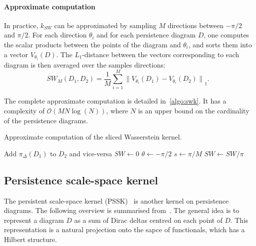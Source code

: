 \documentclass[a4paper,11pt,openany,extrafontsizes]{memoir}
\begin{document}
\paragraph{Approximate computation}

In practice, $k_{SW}$ can be approximated by sampling $M$ directions
between $-\pi/2$ and $\pi/2$. For each direction $\theta_i$ and for
each persistence diagram $D$, one computes the scalar products between
the points of the diagram and $\theta_i$, and sorts them into a vector
$V_{\theta_i}(D)$. The $L_1$-distance between the vectors
corresponding to each diagram is then averaged over the samples
directions:
\[ SW_M(D_1, D_2) = \frac{1}{M} \sum_{i=1}^M {\lVert V_{\theta_i}(D_1)
    - V_{\theta_i}(D_2) \rVert}_1. \]

The complete approximate computation is detailed
in~\autoref{algo:swk}. It has a complexity of
$\mathcal{O}(MN\log(N))$, where $N$ is an upper bound on the
cardinality of the persistence diagrams.

\begin{algorithm}[ht]
  \caption{Approximate computation of the sliced Wasserstein kernel.}\label{algo:swk}
  \DontPrintSemicolon%
  Add $\pi_\Delta(D_1)$ to $D_2$ and vice-versa\;
  $SW \leftarrow 0$\;
  $\theta \leftarrow -\pi/2$\;
  $s \leftarrow \pi/M$\;
  $SW \leftarrow SW/\pi$\:
\end{algorithm}

\subsection{Persistence scale-space kernel}%
\label{sec:pers-scale-space}

The persistent scale-space kernel
(PSSK)~\cite{reininghaus_stable_2015,kwitt_statistical_2015} is
another kernel on persistence diagrams. The following overview is
summarised from~\cite{reininghaus_stable_2015}. The general idea is to
represent a diagram $D$ as a sum of Dirac deltas centred on each point
of $D$. This representation is a natural projection onto the sapce of
functionals, which has a Hilbert structure.
\end{document}
